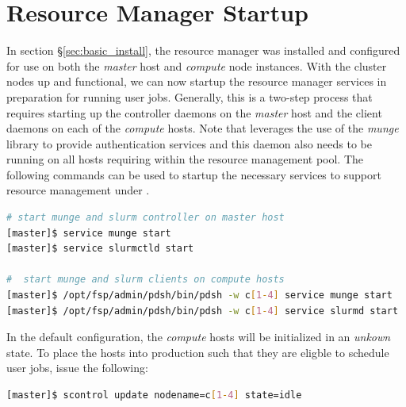 \documentclass[letterpaper]{article}
\begin{document}
\section{Resource Manager Startup}

In section \S\ref{sec:basic_install}, the \SLURM{} resource manager was installed
and configured for use on both the {\em master} host and {\em compute} node
instances. With the cluster nodes up and functional, we can now startup the
resource manager services in preparation for running user jobs. Generally, this
is a two-step process that requires starting up the controller daemons on the {\em
  master} host and the client daemons on each of the {\em compute} hosts.  
Note that \SLURM{} leverages the use of the {\em munge} library to provide
authentication services and this daemon also needs to be running on all hosts
requiring within the resource management pool. 
The following commands can be used to startup the necessary services to support
resource management under \SLURM{}.

\begin{lstlisting}[language=bash]
# start munge and slurm controller on master host
[master]$ service munge start
[master]$ service slurmctld start

#  start munge and slurm clients on compute hosts
[master]$ /opt/fsp/admin/pdsh/bin/pdsh -w c[1-4] service munge start
[master]$ /opt/fsp/admin/pdsh/bin/pdsh -w c[1-4] service slurmd start
\end{lstlisting}

In the default configuration, the {\em compute} hosts will be initialized in an
{\em unkown} state. To place the hosts into production such that they are
eligble to schedule user jobs, issue the following:


\begin{lstlisting}[language=bash]
[master]$ scontrol update nodename=c[1-4] state=idle
\end{lstlisting}
\end{document}
